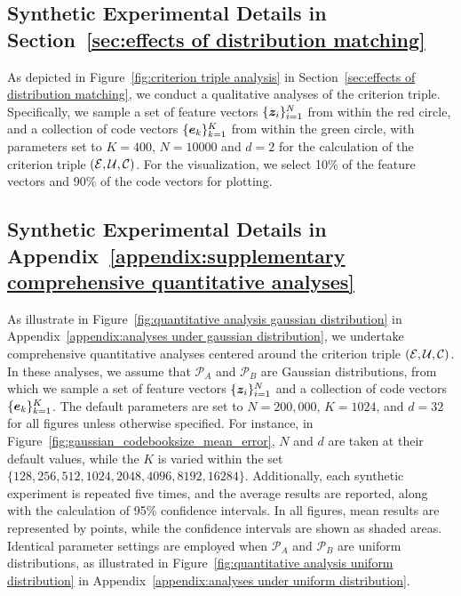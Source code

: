 \subsection{Synthetic Experimental Details in Section~\ref{sec:effects of distribution matching} } \label{appendix:details part1}

As depicted in Figure~\ref{fig:criterion triple analysis} in Section~\ref{sec:effects of distribution matching}, we conduct a qualitative analyses of the criterion triple. Specifically, we sample a set of feature vectors $\{\bm{z}_i\}_{i=1}^N$ from within the red circle, and a collection of code vectors $\{\bm{e}_k\}_{k=1}^K$ from within the green circle, with parameters set to $K=400$, $N=10000$ and $d=2$ for the calculation of the criterion triple $(\mathcal{E}, \mathcal{U}, \mathcal{C})$. For the visualization, we select 10\% of the feature vectors and 90\% of the code vectors for plotting.

\subsection{Synthetic Experimental Details in Appendix~\ref{appendix:supplementary comprehensive quantitative analyses}} \label{appendix:details part3}

As illustrate in Figure~\ref{fig:quantitative analysis gaussian distribution} in Appendix~\ref{appendix:analyses under gaussian distribution}, we undertake comprehensive quantitative analyses centered around the criterion triple $(\mathcal{E}, \mathcal{U}, \mathcal{C})$. In these analyses, we assume that $\mathcal{P}_A$ and $\mathcal{P}_B$ are Gaussian distributions, from which we sample a set of feature vectors $\{\bm{z}_i\}_{i=1}^N$ and a collection of code vectors $\{\bm{e}_k\}_{k=1}^K$. The default parameters are set to $N=200,000$, $K=1024$, and $d=32$ for all figures unless otherwise specified. For instance, in Figure~\ref{fig:gaussian_codebooksize_mean_error}, $N$ and $d$ are taken at their default values, while the $K$ is varied within the set $\{128, 256, 512, 1024, 2048, 4096, 8192, 16284\}$. Additionally, each synthetic experiment is repeated five times, and the average results are reported, along with the calculation of 95\% confidence intervals. In all figures, mean results are represented by points, while the confidence intervals are shown as shaded areas. Identical parameter settings are employed when $\mathcal{P}_A$ and $\mathcal{P}_B$ are uniform distributions, as illustrated in Figure~\ref{fig:quantitative analysis uniform distribution} in Appendix~\ref{appendix:analyses under uniform distribution}.

